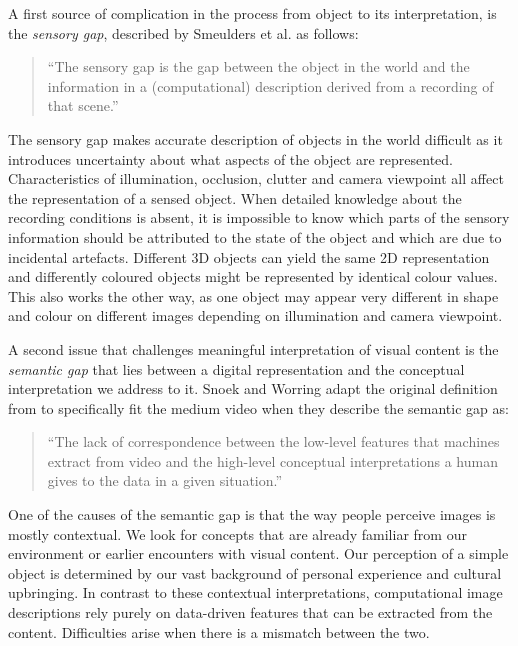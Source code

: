 A first source of complication in the process from object to its interpretation, is the \emph{sensory gap}, described by Smeulders et al. as follows:

\begin{quote}
  ``The sensory gap is the gap between the object in the world and the information in a (computational) description derived from a recording of that scene.''\cite{Smeulders:2000tx}
\end{quote}

The sensory gap makes accurate description of objects in the world difficult as it introduces uncertainty about what aspects of the object are represented. Characteristics of illumination, occlusion, clutter and camera viewpoint all affect the representation of a sensed object. When detailed knowledge about the recording conditions is absent, it is impossible to know which parts of the sensory information should be attributed to the state of the object and which are due to incidental artefacts. Different 3D objects can yield the same 2D representation and differently coloured objects might be represented by identical colour values. This also works the other way, as one object may appear very different in shape and colour on different images depending on illumination and camera viewpoint.

A second issue that challenges meaningful interpretation of visual content is the \emph{semantic gap} that lies between a digital representation and the conceptual interpretation we address to it. Snoek and Worring adapt the original definition from \cite{Smeulders:2000tx} to specifically fit the medium video when they describe the semantic gap as:

\begin{quote}
  ``The lack of correspondence between the low-level features that machines extract from video and the high-level conceptual interpretations a human gives to the data in a given situation.''
\end{quote}

One of the causes of the semantic gap is that the way people perceive images is mostly contextual\cite{Smeulders:2000tx}. We look for concepts that are already familiar from our environment or earlier encounters with visual content. Our perception of a simple object is determined by our vast background of personal experience and cultural upbringing. In contrast to these contextual interpretations, computational image descriptions rely purely on data-driven features that can be extracted from the content. Difficulties arise when there is a mismatch between the two.

